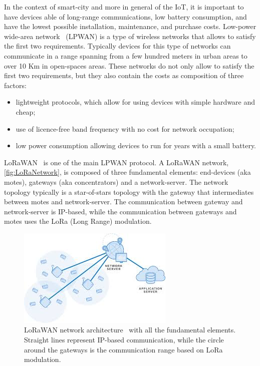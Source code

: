 In the context of smart-city and more in general of the IoT, it is important to have devices able of long-range communications, low battery consumption, and have the lowest possible installation, maintenance, and purchase costs.
Low-power wide-area network~\cite{Raza2017} (LPWAN) is a type of wireless networks that allows to satisfy the first two requirements.
Typically devices for this type of networks can communicate in a range spanning from a few hundred meters in urban areas to over 10 Km in open-spaces areas.
These networks do not only allow to satisfy the first two requirements, but they also contain the costs as composition of three factors:
\begin{itemize}
    \item lightweight protocols, which allow for using devices with simple hardware and cheap;
    \item use of licence-free band frequency with no cost for network occupation;
    \item low power consumption allowing devices to run for years with a small battery.
\end{itemize}

LoRaWAN~\cite{loraalliancetechnicalcommittee2020} is one of the main LPWAN protocol.
A LoRaWAN network, \autoref{fig:LoRaNetwork}, is composed of three fundamental elements: end-devices (aka motes), gateways (aka concentrators) and a network-server. 
% 
The network topology typically is a star-of-stars topology with the gateway that intermediates between motes and network-server.
% 
The communication between gateway and network-server is IP-based, while the communication between gateways and motes uses the LoRa (Long Range) modulation.

\begin{figure}[h]
    \centering
    \includegraphics{figures/lora_architecture2.png}
    \caption[LoRaWAN network architecture]{LoRaWAN network architecture~\cite{muntasirjoarder2020} with all the fundamental elements. Straight lines represent IP-based communication, while the circle around the gateways is the communication range based on LoRa modulation.}
    \label{fig:LoRaNetwork}
\end{figure}

